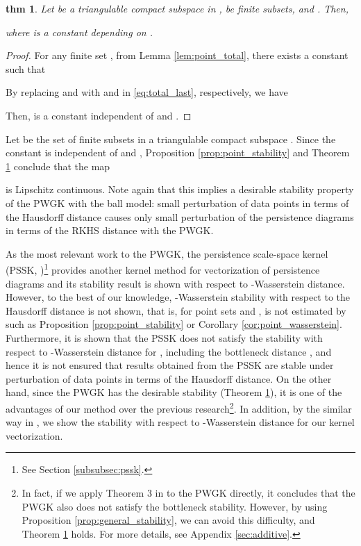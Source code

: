 \documentclass{article}
\newtheorem{thm}{thm}[section]
\begin{document}
\begin{thm}
\label{thm:kernel_stability}
Let  be a triangulable compact subspace in ,  be finite subsets, and .
Then,

where  is a constant depending on .
\end{thm}

\begin{proof}
For any finite set , from Lemma \ref{lem:point_total}, there exists a constant  such that

By replacing  and  with  and  in \eqref{eq:total_last}, respectively, we have 

Then,  is a constant independent of  and .
\end{proof}

Let  be the set of finite subsets in a triangulable compact subspace .
Since the constant  is independent of  and , Proposition \ref{prop:point_stability} and Theorem \ref{thm:kernel_stability} conclude that the map

is Lipschitz continuous.
Note again that this implies a desirable stability property of the PWGK with the ball model: small perturbation of data points in terms of the Hausdorff distance causes only small perturbation of the persistence diagrams in terms of the RKHS distance with the PWGK.

As the most relevant work to the PWGK, the persistence scale-space kernel (PSSK, \cite{RHBK15})\footnote{See Section \ref{subsubsec:pssk}.} provides another kernel method for vectorization of persistence diagrams and its stability result is shown with respect to -Wasserstein distance.
However, to the best of our knowledge, -Wasserstein stability with respect to the Hausdorff distance is not shown, that is, for point sets  and ,  is not estimated by  such as Proposition \ref{prop:point_stability} or Corollary \ref{cor:point_wasserstein}.
Furthermore, it is shown \cite{RHBK15} that the PSSK does not satisfy the stability with respect to -Wasserstein distance for , including the bottleneck distance , and hence it is not ensured that results obtained from the PSSK are stable under perturbation of data points in terms of the Hausdorff distance.
On the other hand, since the PWGK has the desirable stability (Theorem \ref{thm:kernel_stability}), it is one of the advantages of our method over the previous research\footnote{In fact, if we apply Theorem 3 in \cite{RHBK15} to the PWGK directly, it concludes that the PWGK also does not satisfy the bottleneck stability. However, by using Proposition \ref{prop:general_stability}, we can avoid this difficulty, and Theorem  \ref{thm:kernel_stability} holds. For more details, see Appendix \ref{sec:additive}.}.
In addition, by the similar way in \cite{RHBK15}, we show the stability with respect to -Wasserstein distance for our kernel vectorization. 
\end{document}
